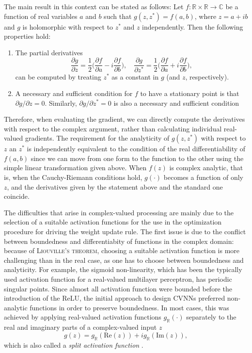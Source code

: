 \documentclass[11pt]{article}
\begin{document}
The main result in this context can be stated as follows:
Let $f\colon \mathbb R\times\mathbb R\to \mathbb C$ be a function of real variables $a$ and $b$ such that $g(z, z^*) = f(a,b)$, where $z = a + ib$ and $g$ is holomorphic with respect to $z^*$ and $z$ independently. Then the following properties hold:
\begin{enumerate}
\item The partial derivatives $$\frac{\partial g}{\partial z}= \frac{1}{2}\Big(\frac{\partial f}{\partial a} - i\frac{\partial f}{\partial b}\Big),\quad \frac{\partial g}{\partial z^*}= \frac{1}{2}\Big(\frac{\partial f}{\partial a} + i\frac{\partial f}{\partial b}\Big),$$can be computed by treating $z^*$ as a constant in $g$ (and $z$, respectively).
\item A necessary and sufficient condition for $f$ to have a stationary point is that $\partial g/\partial z=0$. Similarly, $\partial g/\partial z^*=0$ is also a necessary and sufficient condition
\end{enumerate}

Therefore, when evaluating the gradient, we can directly compute the derivatives with respect to the complex argument, rather than calculating individual real-valued gradients. The requirement for the analyticity of $g(z,z^*)$ with respect to $z$ an $z^*$ is independently equivalent to the condition of the real differentiability of $f(a,b)$ since we can move from one form to the function to the other using the simple linear transformation given above. When $f(z)$ is complex analytic, that is, when the Cauchy-Riemann conditions hold, $g(\cdot)$ becomes a function of only $z$, and the derivatives given by the statement above and the standard one coincide.

The difficulties that arise in complex-valued processing are mainly due to the selection of a suitable activation functions for the use in the optimization procedure for driving the weight update rule. The first issue is due to the conflict between boundedness and differentiabity of functions in the complex domain: because of \textsc{Liouville's theorem}, choosing a suitable activation function is more challenging than in the real case, as one has to choose between boundedness and analyticity. For example, the sigmoid non-linearity, which has been the typically used activation function for a real-valued multilayer perceptron, has periodic singular points. Since almost all activation function were bounded before the introduction of the ReLU, the initial approach to design CVNNs preferred non-analytic functions in order to preserve boundedness. In most cases, this was achieved by applying  real-valued activation functions $g_\mathbb R(\cdot)$ separately to the real and imaginary parts of a complex-valued input $z$
\begin{equation}
g(z) = g_\mathbb R(\text{Re}(z))+ i g_\mathbb R(\text{Im}(z)),
\end{equation}
which is also called a \textit{split activation function} \cite{}.
\end{document}
